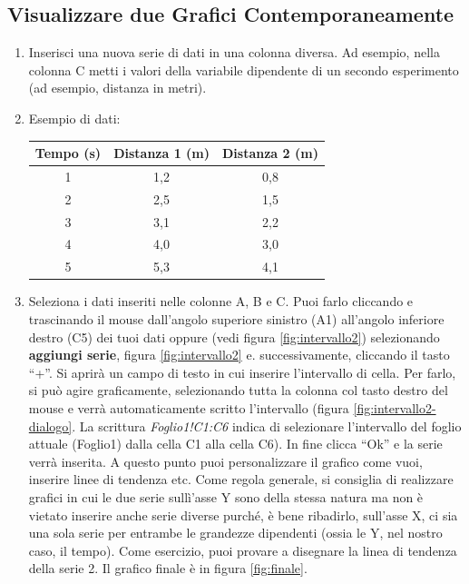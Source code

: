 \subsection{Visualizzare due Grafici Contemporaneamente}
\begin{enumerate}
    \item Inserisci una nuova serie di dati in una colonna diversa. Ad esempio, nella colonna C metti i valori della variabile dipendente di un secondo esperimento (ad esempio, distanza in metri).
    \item Esempio di dati:
    \begin{center}
    \begin{tabular}{|c|c|c|}
    \hline
    Tempo (s) & Distanza 1 (m) & Distanza 2 (m) \\
    \hline
    1 & 1,2 & 0,8 \\
    2 & 2,5 & 1,5 \\
    3 & 3,1 & 2,2 \\
    4 & 4,0 & 3,0 \\
    5 & 5,3 & 4,1 \\
    \hline
    \end{tabular}
    \end{center}
    \item Seleziona i dati inseriti nelle colonne A, B e C. Puoi farlo cliccando e trascinando il mouse dall'angolo superiore sinistro (A1) all'angolo inferiore destro (C5) dei tuoi dati oppure (vedi figura \ref{fig:intervallo2}) selezionando \textbf{aggiungi serie}, figura \ref{fig:intervallo2} e. successivamente, cliccando il tasto ``+''. Si aprirà un campo di testo in cui inserire l'intervallo di cella. Per farlo, si può agire graficamente, selezionando tutta la colonna col tasto destro del mouse e verrà automaticamente scritto l'intervallo (figura \ref{fig:intervallo2-dialogo}. La scrittura \textit{Foglio1!C1:C6} indica di selezionare l'intervallo del foglio attuale (Foglio1) dalla cella C1 alla cella C6). In fine clicca ``Ok'' e la serie verrà inserita. A questo punto puoi personalizzare il grafico come vuoi, inserire linee di tendenza etc. Come regola generale, si consiglia di realizzare grafici in cui le due serie sullì'asse Y sono della stessa natura ma non è vietato inserire anche serie diverse purché, è bene ribadirlo, sull'asse X, ci sia una sola serie per entrambe le grandezze dipendenti (ossia le Y, nel nostro caso, il tempo). Come esercizio, puoi provare a disegnare la linea di tendenza della serie 2. Il grafico finale è in figura \ref{fig:finale}.
    

\end{enumerate}
